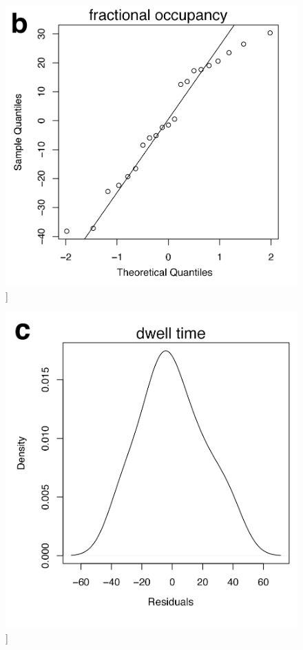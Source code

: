 \documentclass[phd,tocprelim]{cornell}
\renewcommand{\caption}[1]{\singlespacing\hangcaption{#1}\normalspacing}
\begin{document}
\begin{figure}[h!]
		\ContinuedFloat
		\captionsetup{labelformat=adja-page}
    \centering
    \includegraphics[width=1\textwidth]{chapter2/SupplementaryFig13b.png}
    \caption[]{}
\end{figure}
\null
\vfill
\clearpage
\null
\vfill
\begin{figure}[h!]
		\ContinuedFloat
		\captionsetup{labelformat=adja-page}
    \centering
    \includegraphics[width=1\textwidth]{chapter2/SupplementaryFig13c.png}
    \caption[]{}
\end{figure}
\end{document}
